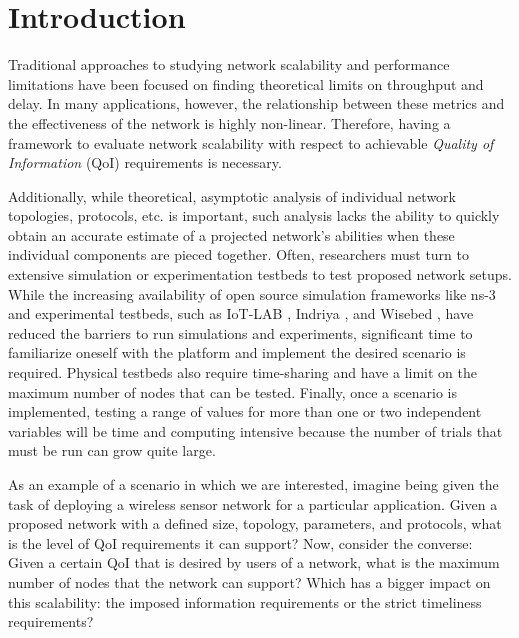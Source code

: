 \section{Introduction}
\label{sec:intro}


Traditional approaches to studying network scalability and performance limitations have been focused on finding theoretical limits on throughput and delay.  In many applications, however, the relationship between these metrics and the effectiveness of the network is highly non-linear.  Therefore, having a framework to evaluate network scalability with respect to achievable \emph{Quality of Information} (QoI) requirements is necessary.

Additionally, while theoretical, asymptotic analysis of individual network topologies, protocols, etc. is important, such analysis lacks the ability to quickly obtain an accurate estimate of a projected network's abilities when these individual components are pieced together. {\color{blue}Often, researchers must turn to extensive simulation or experimentation testbeds to test proposed network setups. While the increasing availability of open source simulation frameworks like ns-3 \cite{ns3} and experimental testbeds, such as IoT-LAB \cite{iot_lab_exp_platform}, Indriya \cite{wsn_testbed}, and Wisebed \cite{wisebed}, have reduced the barriers to run simulations and experiments, significant time to familiarize oneself with the platform and implement the desired scenario is required. Physical testbeds also require time-sharing and have a limit on the maximum number of nodes that can be tested. Finally, once a scenario is implemented, testing a range of values for more than one or two independent variables will be time and computing intensive because the number of trials that must be run can grow quite large.}

As an example of a scenario in which we are interested, imagine being given the task of deploying a wireless sensor network for a particular application. Given a proposed network with a defined size, topology, parameters, and protocols, what is the level of QoI requirements it can support?  Now, consider the converse:  Given a certain QoI that is desired by users of a network, what is the maximum number of nodes that the network can support?  Which has a bigger impact on this scalability: the imposed information requirements or the strict timeliness requirements? 

